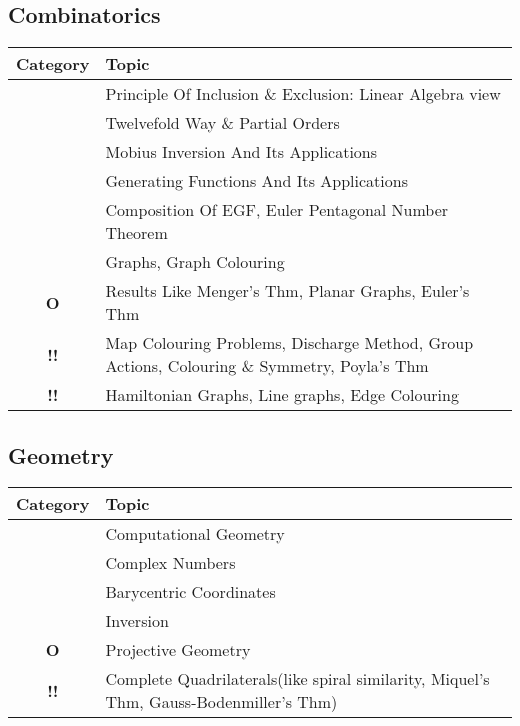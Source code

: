 \documentclass[11pt]{scrartcl}
\providecommand{\isRq}{{\color{green!60!black}\CheckmarkBold}}
\providecommand{\isUs}{{\color{cyan}\sffamily\bfseries O}}
\providecommand{\isAv}{{\color{gray}\sffamily\bfseries !!}}
\begin{document}
\subsection{Combinatorics}
\begin{center}
  \begin{tabular}{cp{12cm}}
  \toprule Category & Topic \\ \midrule
  \isRq & Principle Of Inclusion \& Exclusion: Linear Algebra view\\
  \isRq & Twelvefold Way \& Partial Orders\\
  \isRq & Mobius Inversion And Its Applications\\
  \isRq & Generating Functions And Its Applications\\
  \isRq & Composition Of EGF, Euler Pentagonal Number Theorem\\
  \isRq & Graphs, Graph Colouring\\
  \isUs & Results Like Menger's Thm, Planar Graphs, Euler's Thm\\
  \isAv & Map Colouring Problems, Discharge Method, Group Actions, Colouring \& Symmetry, Poyla's Thm\\
  \isAv & Hamiltonian Graphs, Line graphs, Edge Colouring\\
\bottomrule
\end{tabular}
\end{center} 

\subsection{Geometry}
\begin{center}
  \begin{tabular}{cp{12cm}}
  \toprule Category & Topic \\ \midrule
  \isRq & Computational Geometry\\
  \isRq & Complex Numbers\\
  \isRq & Barycentric Coordinates\\
  \isRq & Inversion\\
  \isUs & Projective Geometry\\
  \isAv & Complete Quadrilaterals(like spiral similarity, Miquel's Thm, Gauss-Bodenmiller's Thm)\\
\bottomrule
\end{tabular}
\end{center} 
\end{document}
